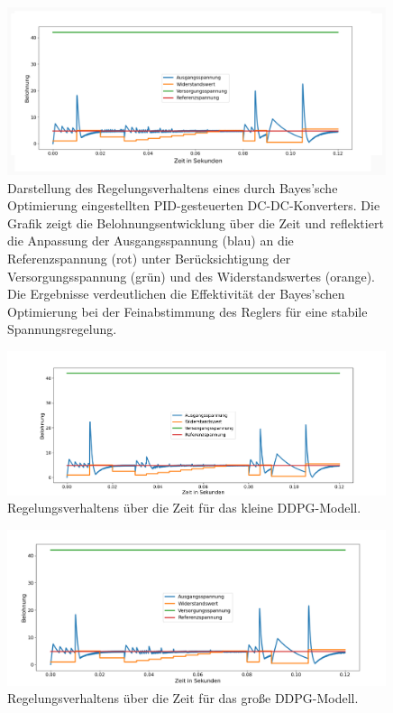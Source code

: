 \begin{figure}[htbp]
\centering
\includegraphics[width=0.99\textwidth, trim=10px 10px 10px 10px, clip]{4Ergebnisse/Phasen/1Phase/1S_small_search_space_bayes.png}
\caption{Darstellung des Regelungsverhaltens eines durch Bayes'sche Optimierung eingestellten PID-gesteuerten DC-DC-Konverters. Die Grafik zeigt die Belohnungsentwicklung über die Zeit und reflektiert die Anpassung der Ausgangsspannung (blau) an die Referenzspannung (rot) unter Berücksichtigung der Versorgungsspannung (grün) und des Widerstandswertes (orange). Die Ergebnisse verdeutlichen die Effektivität der Bayes'schen Optimierung bei der Feinabstimmung des Reglers für eine stabile Spannungsregelung.}
\label{fig:bayesian_optimization_pid_control}
\end{figure}
%
\begin{figure}[htbp]
\centering
\includegraphics[width=0.99\textwidth]{4Ergebnisse/Phasen/1Phase//1T_small_search_space_small_net_dcdc.png}
\caption{Regelungsverhaltens über die Zeit für das kleine DDPG-Modell.}
\label{fig:small_ddpg_results}
\end{figure}
%
\begin{figure}[htbp]
\centering
\includegraphics[width=0.99\textwidth]{4Ergebnisse/Phasen/1Phase//1U_big_net_dcdc.png}
\caption{Regelungsverhaltens über die Zeit für das große DDPG-Modell.}
\label{fig:large_ddpg_results}
\end{figure}

